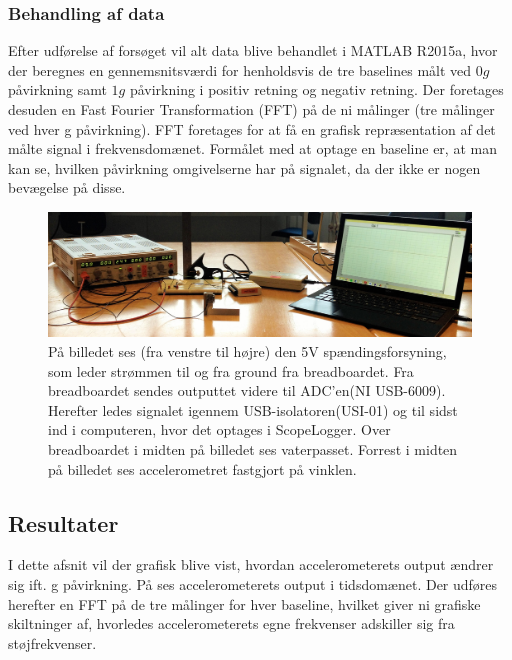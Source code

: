 \subsubsection{Behandling af data}
Efter udførelse af forsøget vil alt data blive behandlet i MATLAB R2015a, hvor der beregnes en gennemsnitsværdi for henholdsvis de tre baselines målt ved $0g$ påvirkning samt $1g$ påvirkning i positiv retning og negativ retning. Der foretages desuden en Fast Fourier Transformation (FFT) på de ni målinger (tre målinger ved hver g påvirkning). FFT foretages for at få en grafisk repræsentation af det målte signal i frekvensdomænet. Formålet med at optage en baseline er, at man kan se, hvilken påvirkning omgivelserne har på signalet, da der ikke er nogen bevægelse på disse.

\begin{figure}[H]
	\centering
	\includegraphics[scale=0.14]{figures/cProblemloesning/Pilotforsoeg1_2.jpg}
	\caption{På billedet ses (fra venstre til højre) den 5V spændingsforsyning, som leder strømmen til og fra ground fra breadboardet. Fra breadboardet sendes outputtet videre til ADC'en(NI USB-6009). Herefter ledes signalet igennem USB-isolatoren(USI-01) og til sidst ind i computeren, hvor det optages i ScopeLogger. Over breadboardet i midten på billedet ses vaterpasset. Forrest i midten på billedet ses accelerometret fastgjort på vinklen.}
	\label{pforsoeg2}
\end{figure}

\subsection{Resultater}\label{Sec_Pilot_Data}
I dette afsnit vil der grafisk blive vist, hvordan accelerometerets output ændrer sig ift. g påvirkning. På  ses accelerometerets output i tidsdomænet. Der udføres herefter en FFT på de tre målinger for hver baseline, hvilket giver ni grafiske skiltninger af, hvorledes accelerometerets egne frekvenser adskiller sig fra støjfrekvenser.

